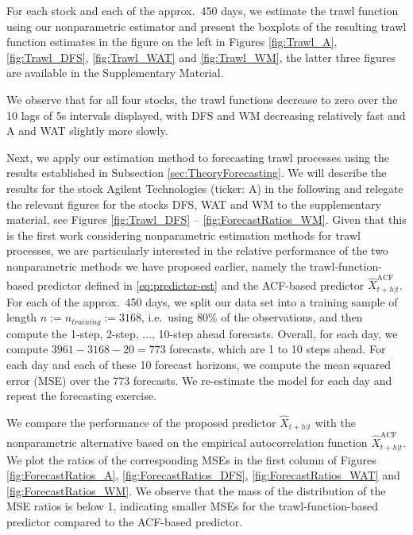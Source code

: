 \documentclass{article}
\theoremstyle{plain}
\theoremstyle{definition}
\theoremstyle{remark}
\begin{document}
For each stock and each of the approx.~450 days, 
we estimate the trawl function using our nonparametric estimator and present the boxplots of the resulting trawl function estimates in the  figure on the left in Figures \ref{fig:Trawl_A}, \ref{fig:Trawl_DFS}, \ref{fig:Trawl_WAT} and \ref{fig:Trawl_WM}, the latter three figures are available in the Supplementary Material. 

We observe that for all four stocks, the trawl functions decrease to zero over the 10 lags of 5s intervals displayed, with DFS and WM decreasing relatively fast and A and WAT slightly more slowly.

Next, we apply our estimation method to forecasting trawl processes using the results established in Subsection \ref{sec:TheoryForecasting}. We will describe the results for the stock Agilent Technologies (ticker: A) in the following and relegate the relevant figures for the stocks DFS, WAT and WM to the supplementary material, see 
Figures \ref{fig:Trawl_DFS} --
 \ref{fig:ForecastRatios_WM}. Given that this is the first work considering nonparametric estimation methods for trawl processes, we are particularly interested in the relative performance of the two nonparametric methods we have proposed earlier, namely the trawl-function-based predictor defined in \eqref{eq:predictor-est} and the ACF-based predictor $\hat X_{t+h|t}^{\mathrm{ACF}}$. For each of the approx.~450 days, we split our data set into a training sample of length $n:=n_{training}:=3168$, i.e.~using 80\% of the observations,  
and then compute the 1-step, 2-step, $\ldots$, 10-step ahead forecasts.
Overall, for each day, we compute $3961-3168-20=773$ forecasts, which are 1 to 10 steps ahead. For each day and each of these 10 forecast horizons, we compute the mean squared error (MSE)  over the 773 forecasts. 
We re-estimate the model for each day and repeat the forecasting exercise. 

We compare the performance of the proposed predictor 
$\hat X_{t+h|t}$ with the nonparametric alternative based on the empirical autocorrelation function 	$\hat X_{t+h|t}^{\mathrm{ACF}}$. We plot the ratios of the corresponding MSEs in the first column of Figures \ref{fig:ForecastRatios_A}, \ref{fig:ForecastRatios_DFS}, \ref{fig:ForecastRatios_WAT} and \ref{fig:ForecastRatios_WM}.
We observe that the mass of the distribution of the MSE ratios is below 1, indicating smaller MSEs for the trawl-function-based predictor compared to the ACF-based predictor. 
\end{document}
